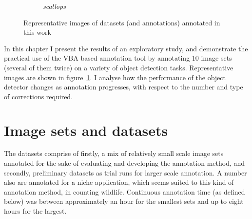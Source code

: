 \begin{figure}[htbp]
\begin{subfigure}[t]{0.24\linewidth}
  \caption{\emph{scallops}}
\end{subfigure}
\caption{Representative images of datasets (and annotations) annotated in this work}
\label{fig:datasets_all}
\end{figure}


In this chapter I present the results of an exploratory study, and demonstrate the practical use of the \gls{VBA} based annotation tool by annotating 10 image sets (several of them twice) on a variety of object detection tasks. Representative images are shown in figure~\ref{fig:datasets_all}. I analyse how the performance of the object detector changes as annotation progresses, with respect to the number and type of corrections required.

\section{Image sets and datasets}


The datasets comprise of firstly, a mix of relatively small scale image sets annotated for the sake of evaluating and developing the annotation method, and secondly, preliminary datasets as trial runs for larger scale annotation. A number also are annotated for a niche application, which seems suited to this kind of annotation method, in counting wildlife. Continuous annotation time (as defined below) was between approximately an hour for the smallest sets and up to eight hours for the largest.

